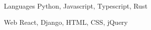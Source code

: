 



\begin{cvskills}


  \cvskill
    {Languages} %
    {Python, Javascript, Typescript, Rust} %


  \cvskill
    {Web} %
    {React, Django, HTML, CSS, jQuery} %


\end{cvskills}
